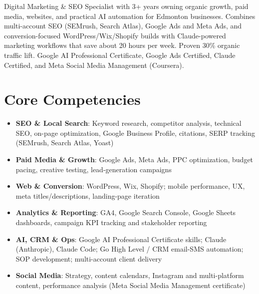 \documentclass[11pt,a4paper,sans]{moderncv}
\begin{document}
\makecvtitle

\vspace{6pt}
\small{Digital Marketing \& SEO Specialist with 3+ years owning organic growth, paid media, websites, and practical AI automation for Edmonton businesses. Combines multi-account SEO (SEMrush, Search Atlas), Google Ads and Meta Ads, and conversion-focused WordPress/Wix/Shopify builds with Claude-powered marketing workflows that save about 20 hours per week. Proven 30\% organic traffic lift. Google AI Professional Certificate, Google Ads Certified, Claude Certified, and Meta Social Media Management (Coursera).}

\section{Core Competencies}
\vspace{1pt}
\begin{itemize}
\item \textbf{SEO \& Local Search}: Keyword research, competitor analysis, technical SEO, on-page optimization, Google Business Profile, citations, SERP tracking (SEMrush, Search Atlas, Yoast)
\item \textbf{Paid Media \& Growth}: Google Ads, Meta Ads, PPC optimization, budget pacing, creative testing, lead-generation campaigns
\item \textbf{Web \& Conversion}: WordPress, Wix, Shopify; mobile performance, UX, meta titles/descriptions, landing-page iteration
\item \textbf{Analytics \& Reporting}: GA4, Google Search Console, Google Sheets dashboards, campaign KPI tracking and stakeholder reporting
\item \textbf{AI, CRM \& Ops}: Google AI Professional Certificate skills; Claude (Anthropic), Claude Code; Go High Level / CRM email-SMS automation; SOP development; multi-account client delivery
\item \textbf{Social Media}: Strategy, content calendars, Instagram and multi-platform content, performance analysis (Meta Social Media Management certificate)
\end{itemize}
\end{document}
